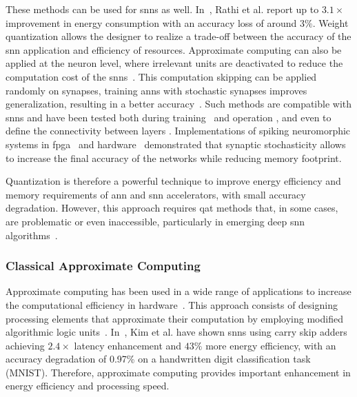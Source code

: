 These methods can be used for \glspl{snn} as well. In~\cite{rathi2018stdp}, Rathi et al. report up to $3.1\times$ improvement in energy consumption with an accuracy loss of around $3\%$. Weight quantization allows the designer to realize a trade-off between the accuracy of the \gls{snn} application and efficiency of resources. Approximate computing can also be applied at the neuron level, where irrelevant units are deactivated to reduce the computation cost of the \glspl{snn}~\cite{sen2017approximate}. This computation skipping can be applied randomly on synapses, training \glspl{ann} with stochastic synapses improves generalization, resulting in a better accuracy~\cite{srivastava2014dropout, wan2013regularization}. Such methods are compatible with \glspl{snn} and have been tested both during training~\cite{neftci2016stochastic, srinivasan2016magnetic} and operation \cite{buesing2011neural}, and even to define the connectivity between layers \cite{bellec2017deep, chen20184096}. Implementations of spiking neuromorphic systems in \gls{fpga}~\cite{sheik2016synaptic} and hardware~\cite{jerry2017ultra} demonstrated that synaptic stochasticity allows to increase the final accuracy of the networks while reducing memory footprint.

Quantization is therefore a powerful technique to improve energy efficiency and memory requirements of \gls{ann} and \gls{snn} accelerators, with small accuracy degradation. However, this approach requires \gls{qat} methods that, in some cases, are problematic or even inaccessible, particularly in emerging deep \gls{snn} algorithms~\cite{zhang2018survey}.

\subsubsection{Classical Approximate Computing}
Approximate computing has been used in a wide range of applications to increase the computational efficiency in hardware~\cite{han2013approximate}. This approach consists of designing processing elements that approximate their computation by employing modified algorithmic logic units~\cite{han2013approximate}. In~\cite{kim2013energy}, Kim et al. have shown \glspl{snn} using carry skip adders achieving $2.4\times$ latency enhancement and $43\%$ more energy efficiency, with an accuracy degradation of 0.97\% on a handwritten digit classification task (MNIST). Therefore, approximate computing provides important enhancement in energy efficiency and processing speed.

